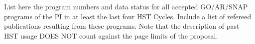 %
%
%
\pasthstusage  %
      
List here the program numbers and data status for all accepted GO/AR/SNAP programs of the PI in at least the last four HST Cycles. Include a list of refereed publications resulting from these programs. Note that the description of past HST usage  DOES NOT count against the page limits of the proposal.
